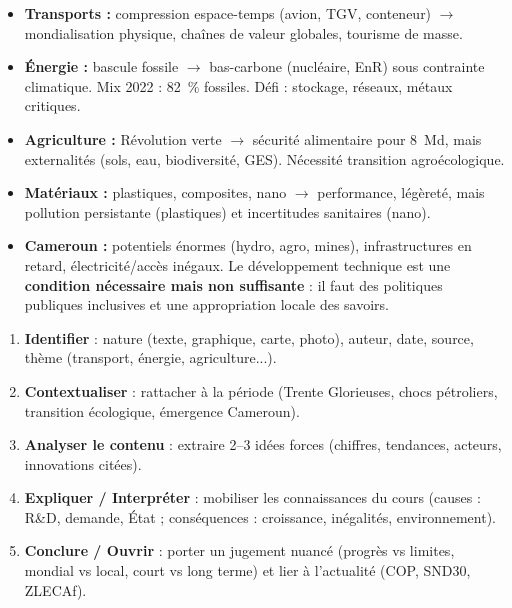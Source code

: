 \documentclass[11pt]{article}
\begin{document}
\begin{aretenir}
\begin{itemize}
    \item \textbf{Transports :} compression espace-temps (avion, TGV, conteneur) $\to$ mondialisation physique, chaînes de valeur globales, tourisme de masse.
    \item \textbf{Énergie :} bascule fossile $\to$ bas-carbone (nucléaire, EnR) sous contrainte climatique. Mix 2022 : 82~\% fossiles. Défi : stockage, réseaux, métaux critiques.
    \item \textbf{Agriculture :} Révolution verte $\to$ sécurité alimentaire pour 8~Md, mais externalités (sols, eau, biodiversité, GES). Nécessité transition agroécologique.
    \item \textbf{Matériaux :} plastiques, composites, nano $\to$ performance, légèreté, mais pollution persistante (plastiques) et incertitudes sanitaires (nano).
    \item \textbf{Cameroun :} potentiels énormes (hydro, agro, mines), infrastructures en retard, électricité/accès inégaux. Le développement technique est une \textbf{condition nécessaire mais non suffisante} : il faut des politiques publiques inclusives et une appropriation locale des savoirs.
\end{itemize}
\end{aretenir}

\begin{methode}
\begin{enumerate}
    \item \textbf{Identifier} : nature (texte, graphique, carte, photo), auteur, date, source, thème (transport, énergie, agriculture...).
    \item \textbf{Contextualiser} : rattacher à la période (Trente Glorieuses, chocs pétroliers, transition écologique, émergence Cameroun).
    \item \textbf{Analyser le contenu} : extraire 2–3 idées forces (chiffres, tendances, acteurs, innovations citées).
    \item \textbf{Expliquer / Interpréter} : mobiliser les connaissances du cours (causes : R\&D, demande, État ; conséquences : croissance, inégalités, environnement).
    \item \textbf{Conclure / Ouvrir} : porter un jugement nuancé (progrès vs limites, mondial vs local, court vs long terme) et lier à l'actualité (COP, SND30, ZLECAf).
\end{enumerate}
\end{methode}
\end{document}
